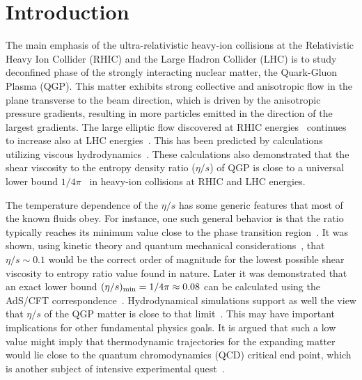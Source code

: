 
\section{Introduction}


The main emphasis of the ultra-relativistic heavy-ion collisions at the Relativistic Heavy Ion Collider (RHIC) and the Large Hadron Collider (LHC) is to study deconfined phase of the strongly interacting nuclear matter, the Quark-Gluon Plasma (QGP). 
This matter exhibits strong collective and anisotropic flow in the plane transverse to the beam direction, which is driven by the anisotropic pressure gradients, resulting in more particles emitted in the direction of the largest gradients.
The large elliptic flow discovered at RHIC energies~\cite{Ackermann:2000tr} continues to increase also at LHC energies~\cite{Aamodt:2010pa,Adam:2016izf}. This has been predicted by calculations utilizing viscous hydrodynamics~\cite{Romatschke:2007mq,Shen:2011eg,Schenke:2011zz,Bozek:2012qs,Gale:2012rq,Hirano:2010je}.
These calculations also demonstrated that the shear viscosity to the entropy density ratio ($\eta/s$) of QGP is close to a universal lower bound $1/4\pi$~\cite{Kovtun:2004de} in heavy-ion collisions at RHIC and LHC energies.

The temperature dependence of the $\eta/s$ has some generic features that most of the known fluids obey. For instance, one such general behavior is that the ratio typically reaches its minimum value close to the phase transition region~\cite{Lacey:2006bc}. 
It was shown, using kinetic theory and quantum mechanical considerations~\cite{PhysRevD.31.53}, that $\eta/s\sim0.1$ would be the correct order of magnitude for the lowest possible shear viscosity to entropy ratio value found in nature. Later it was demonstrated that an exact lower bound $(\eta/s)_{\rm min}=1/4\pi\approx0.08$ can be calculated using the AdS/CFT correspondence~\cite{Kovtun:2004de}. Hydrodynamical simulations support as well the view that $\eta/s$ of the QGP matter is close to that limit~\cite{Gale:2012rq}. This may have important implications for other fundamental physics goals. It is argued that such a low value might imply that thermodynamic trajectories for the expanding matter would lie close to the quantum chromodynamics (QCD) critical end point, which is another subject of intensive experimental quest~\cite{Lacey:2006bc}.

